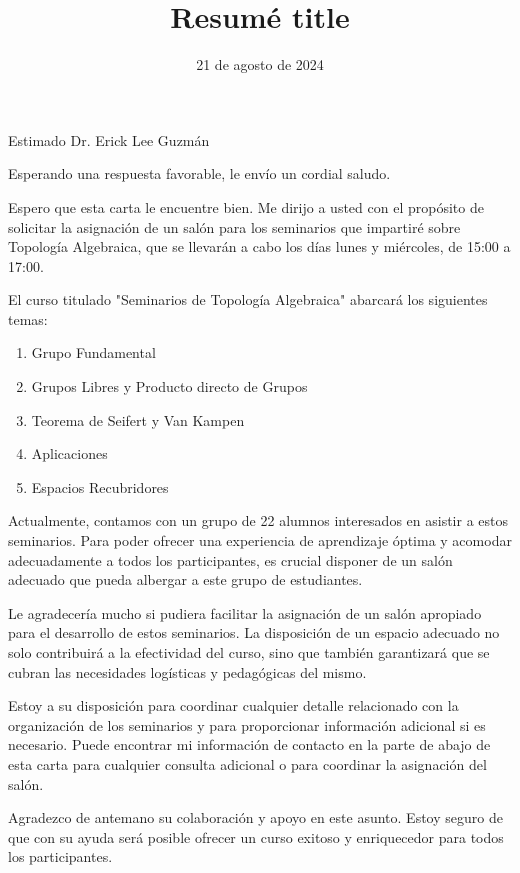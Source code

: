 \documentclass[11pt,a4paper,sans]{moderncv}        %
\title{Resumé title}                               %
\begin{document}
\date{21 de agosto de 2024}
\opening{Estimado Dr. Erick Lee Guzmán}
\closing{Esperando una respuesta favorable, le envío un cordial saludo.}

\makelettertitle

Espero que esta carta le encuentre bien. Me dirijo a usted con el propósito de solicitar la asignación de un salón para los seminarios que impartiré sobre Topología Algebraica, que se llevarán a cabo los días lunes y miércoles, de 15:00 a 17:00.

El curso titulado "Seminarios de Topología Algebraica" abarcará los siguientes temas:

\begin{enumerate}
    \item Grupo Fundamental
    \item Grupos Libres y Producto directo de Grupos
    \item Teorema de Seifert y Van Kampen
    \item Aplicaciones
    \item Espacios Recubridores
\end{enumerate}

Actualmente, contamos con un grupo de 22 alumnos interesados en asistir a estos seminarios. Para poder ofrecer una experiencia de aprendizaje óptima y acomodar adecuadamente a todos los participantes, es crucial disponer de un salón adecuado que pueda albergar a este grupo de estudiantes.

Le agradecería mucho si pudiera facilitar la asignación de un salón apropiado para el desarrollo de estos seminarios. La disposición de un espacio adecuado no solo contribuirá a la efectividad del curso, sino que también garantizará que se cubran las necesidades logísticas y pedagógicas del mismo.

Estoy a su disposición para coordinar cualquier detalle relacionado con la organización de los seminarios y para proporcionar información adicional si es necesario. Puede encontrar mi información de contacto en la parte de abajo de esta carta para cualquier consulta adicional o para coordinar la asignación del salón.

Agradezco de antemano su colaboración y apoyo en este asunto. Estoy seguro de que con su ayuda será posible ofrecer un curso exitoso y enriquecedor para todos los participantes.

\makeletterclosing
\end{document}
